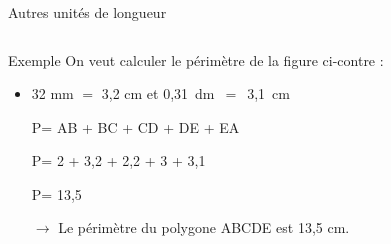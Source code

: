 \documentclass[xcolor=table]{beamer}
\begin{document}
\begin{frame}
	\frametitle{}  
	\framesubtitle{}	
	
	\begin{alertblock}{Autres unités de longueur}
		\tiny{}
	\end{alertblock}
	
	\begin{columns}[onlytextwidth]
		\begin{column}{0.64\textwidth}
			\begin{block}{Exemple}
				On veut calculer le périmètre de la figure ci-contre : 
				
				\begin{small}
					\begin{itemize}
						\item 32 mm $=$ 3,2 cm et 0,31~dm~$=$~3,1~cm
						\item[P=]  AB + BC + CD + DE + EA
						\item[P=] 2 + 3,2 + 2,2 + 3 + 3,1 
						\item[P=] 13,5
						\item[$\rightarrow$] Le périmètre du polygone ABCDE est 13,5 cm.
					\end{itemize}	
				\end{small}
				
				 
				
				
			\end{block}
		\end{column}
		\begin{column}{0.35\textwidth}
		\end{column}
	\end{columns}
	
\end{frame}
\end{document}
